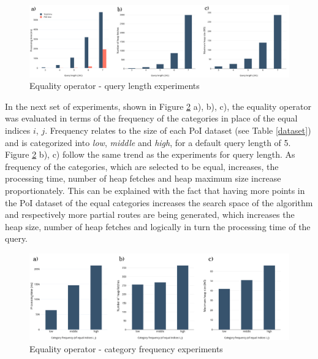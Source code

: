 \begin{figure}[H]
	\includegraphics[scale=0.25]{images/eo_length.png}
	\centering
	\caption{Equality operator - query length experiments}
	\label{fig:eo_length}
\end{figure}

In the next set of experiments, shown in Figure \ref{fig:eo_frequency} a), b), c), the equality operator was evaluated in terms of the frequency of the categories in place of the equal indices $i$, $j$. Frequency relates to the size of each PoI dataset (see Table \ref{dataset}) and is categorized into \textit{low}, \textit{middle} and \textit{high}, for a default query length of 5.  Figure \ref{fig:eo_frequency} b), c) follow the same trend as the experiments for query length. 
As frequency of the categories, which are selected to be equal, increases, the processing time, number of heap fetches and heap maximum size increase proportionately. This can be explained with the fact that having more points in the PoI dataset of the equal categories increases the search space of the algorithm and respectively more partial routes are being generated, which increases the heap size, number of heap fetches and logically in turn the processing time of the query.

\begin{figure}[H]
	\includegraphics[scale=0.3]{images/eo_frequency.png}
	\centering
	\caption{Equality operator - category frequency experiments}
	\label{fig:eo_frequency}
\end{figure}


